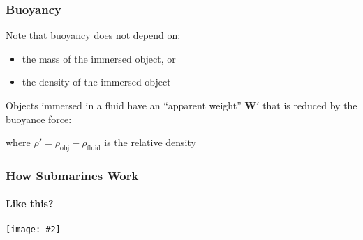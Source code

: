 \documentclass[12pt,aspectratio=169]{beamer}
\newcommand{\pic}[2]{\texttt{[image: \#2]}}
\newcommand{\mb}[1]{\mathbf{#1}}
\newcommand{\eq}[2]{\vspace{#1}{\Large\begin{displaymath}#2\end{displaymath}}}
\begin{document}
\begin{frame}
  \frametitle{Buoyancy}
  Note that buoyancy does not depend on:
  \begin{itemize}
  \item the mass of the immersed object, or
  \item the density of the immersed object
  \end{itemize}
%
  \vspace{.15in}Objects immersed in a fluid have an ``apparent weight''
  $\mb{W}'$ that is reduced by the buoyance force:

  \eq{-.2in}{
    \mb{W}' = \mb{W}-\mb{B}=\rho'\mb{g}V
  }
  
  where $\rho'=\rho_{\textrm{obj}}-\rho_{\textrm{fluid}}$ is the relative density
\end{frame}



\begin{frame}
  \frametitle{How Submarines Work}
  \framesubtitle{Like this?}
  \begin{center}
    \pic{.7}{EbHMOXk.png}
  \end{center}
\end{frame}
\end{document}
